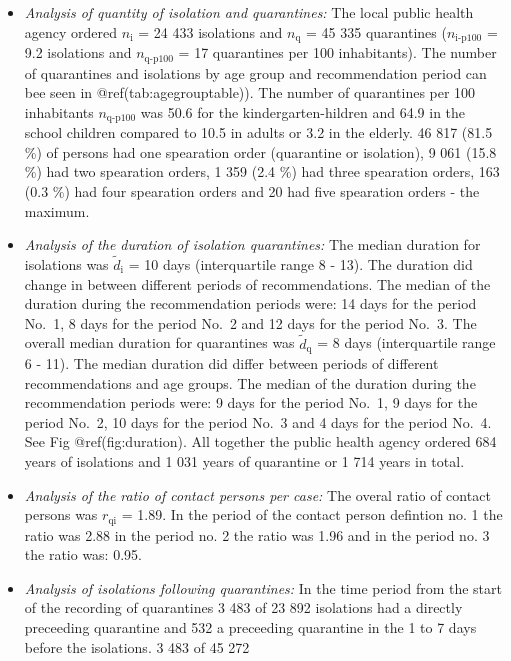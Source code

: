 \documentclass[
]{article}
\begin{document}
\begin{itemize}
\item
  \emph{Analysis of quantity of isolation and quarantines:} The local
  public health agency ordered \(n_{\text{i}}\) = 24 433 isolations and
  \(n_{\text{q}}\) = 45 335 quarantines (\(n_{\text{i-p100}}\) = 9.2
  isolations and \(n_{\text{q-p100}}\) = 17 quarantines per 100
  inhabitants). The number of quarantines and isolations by age group
  and recommendation period can bee seen in @ref(tab:agegrouptable)).
  The number of quarantines per 100 inhabitants \(n_{\text{q-p100}}\)
  was 50.6 for the kindergarten-hildren and 64.9 in the school children
  compared to 10.5 in adults or 3.2 in the elderly. 46 817 (81.5 \%) of
  persons had one spearation order (quarantine or isolation), 9 061
  (15.8 \%) had two spearation orders, 1 359 (2.4 \%) had three
  spearation orders, 163 (0.3 \%) had four spearation orders and 20 had
  five spearation orders - the maximum.
\item
  \emph{Analysis of the duration of isolation quarantines:} The median
  duration for isolations was \(\tilde d_{\text{i}}\) = 10 days
  (interquartile range 8 - 13). The duration did change in between
  different periods of recommendations. The median of the duration
  during the recommendation periods were: 14 days for the period No.~1,
  8 days for the period No.~2 and 12 days for the period No.~3. The
  overall median duration for quarantines was \(\tilde d_{\text{q}}\) =
  8 days (interquartile range 6 - 11). The median duration did differ
  between periods of different recommendations and age groups. The
  median of the duration during the recommendation periods were: 9 days
  for the period No.~1, 9 days for the period No.~2, 10 days for the
  period No.~3 and 4 days for the period No.~4. See Fig
  @ref(fig:duration). All together the public health agency ordered 684
  years of isolations and 1 031 years of quarantine or 1 714 years in
  total.
\item
  \emph{Analysis of the ratio of contact persons per case:} The overal
  ratio of contact persons was \(r_{\text{qi}}\) = 1.89. In the period
  of the contact person defintion no. 1 the ratio was 2.88 in the period
  no. 2 the ratio was 1.96 and in the period no. 3 the ratio was: 0.95.
\item
  \emph{Analysis of isolations following quarantines:} In the time
  period from the start of the recording of quarantines 3 483 of 23 892
  isolations had a directly preceeding quarantine and 532 a preceeding
  quarantine in the 1 to 7 days before the isolations. 3 483 of 45 272

\end{itemize}
\end{document}
